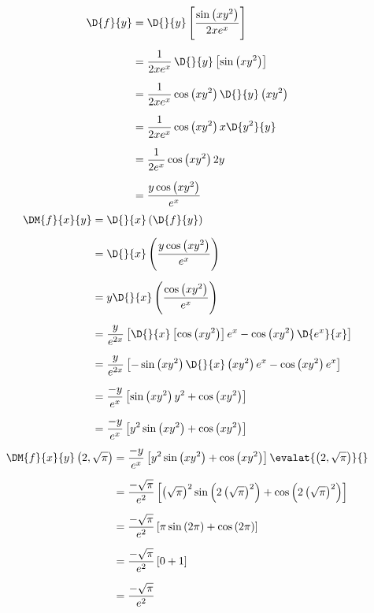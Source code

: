 \documentclass[a4paper,12pt,fleqn]{article}
\begin{document}
\begin{answer}
  \begin{align*}
    \D{f}{y}
    & = \D{}{y} \left[\frac{\sin\left(xy^2\right)}{2xe^x}\right]       \\[2mm]
    & = \frac{1}{2xe^x} \, \D{}{y} \left[\sin\left(xy^2\right)\right]  \\[2mm]
    & = \frac{1}{2xe^x} \cos\left(xy^2\right) \D{}{y}\left(xy^2\right) \\[2mm]
    & = \frac{1}{2xe^x} \cos\left(xy^2\right) x \D{y^2}{y}             \\[2mm]
    & = \frac{1}{2e^x} \cos\left(xy^2\right) 2y                        \\[2mm]
    & = \frac{y\cos\left(xy^2\right)}{e^x}
  \end{align*}
  \begin{align*}
    \DM{f}{x}{y}
    & = \D{}{x}\left(\D{f}{y}\right)                                  \\[2mm]
    & = \D{}{x}\left(\frac{y\cos\left(xy^2\right)}{e^x}\right)        \\[2mm]
    & = y \D{}{x}\left(\frac{\cos\left(xy^2\right)}{e^x}\right)       \\[2mm]
    & = \frac{y}{e^{2x}}\left[
           \D{}{x}\left[\cos\left(xy^2\right)\right]e^x  -
           \cos\left(xy^2\right)\D{e^x}{x}
        \right]                                                       \\[2mm]
    & = \frac{y}{e^{2x}}\left[
          -\sin\left(xy^2\right)\D{}{x}\left(xy^2\right)e^x  -
          \cos\left(xy^2\right)e^x
        \right]                                                       \\[2mm]
    & = \frac{-y}{e^{x}}\left[
          \sin\left(xy^2\right)y^2 + \cos\left(xy^2\right)
        \right]                                                       \\[2mm]
    & = \frac{-y}{e^{x}}\left[
        y^2\sin\left(xy^2\right) + \cos\left(xy^2\right)
        \right]
  \end{align*}
  \begin{align*}
    \DM{f}{x}{y}\left(2, \sqrt{\pi}\right)
    & = \frac{-y}{e^{x}}\left[
          y^2\sin\left(xy^2\right) + \cos\left(xy^2\right)
        \right] \evalat{\left(2, \sqrt{\pi}\right)}{} \\[2mm]
    & = \frac{-\sqrt{\pi}}{e^2}\left[
          \left(\sqrt{\pi}\right)^2\sin\left(2\left(\sqrt{\pi}\right)^2\right)
          + \cos\left(2\left(\sqrt{\pi}\right)^2\right)
        \right]  \\[2mm]
    & = \frac{-\sqrt{\pi}}{e^2}\left[
          \pi\sin\left(2\pi\right)
          + \cos\left(2\pi\right)
        \right]   \\[2mm]
    & = \frac{-\sqrt{\pi}}{e^2}\left[ 0 + 1 \right]    \\[2mm]
    & = \frac{-\sqrt{\pi}}{e^2}
  \end{align*}
\end{answer}
\end{document}
